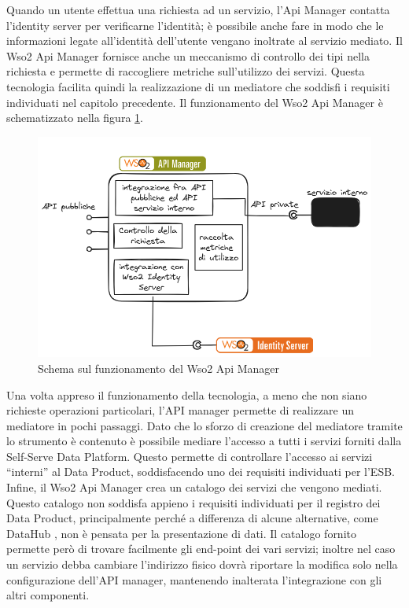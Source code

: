\documentclass[12pt]{report}
\begin{document}
Quando un utente effettua una richiesta ad un servizio, l'Api Manager contatta l'identity server per verificarne l'identità; è possibile anche fare in modo che le informazioni legate all'identità dell'utente vengano inoltrate al servizio mediato.
Il Wso2 Api Manager fornisce anche un meccanismo di controllo dei tipi nella richiesta e permette di raccogliere metriche sull'utilizzo dei servizi. 
Questa tecnologia facilita quindi la realizzazione di un mediatore che soddisfi i requisiti individuati nel capitolo precedente.
Il funzionamento del Wso2 Api Manager è schematizzato nella figura \ref{funzionamento_api_manager}.
\begin{figure}[H]
    \centering
    \includegraphics[width=\linewidth]{immagini/wso2 apim schema.png}
    \caption{Schema sul funzionamento del Wso2 Api Manager}
    \label{funzionamento_api_manager}
\end{figure}
Una volta appreso il funzionamento della tecnologia, a meno che non siano richieste operazioni particolari, l'API manager permette di realizzare un mediatore in pochi passaggi.
Dato che lo sforzo di creazione del mediatore tramite lo strumento è contenuto è possibile mediare l'accesso a tutti i servizi forniti dalla Self-Serve Data Platform.
Questo permette di controllare l'accesso ai servizi ``interni'' al Data Product, soddisfacendo uno dei requisiti individuati per l'ESB.
Infine, il Wso2 Api Manager crea un catalogo dei servizi che vengono mediati. 
Questo catalogo non soddisfa appieno i requisiti individuati per il registro dei Data Product, principalmente perché a differenza di alcune alternative, come DataHub \cite{documentazione_data_hub}, non è pensata per la presentazione di dati.
Il catalogo fornito permette però di trovare facilmente gli end-point dei vari servizi; inoltre nel caso un servizio debba cambiare l'indirizzo fisico dovrà riportare la modifica solo nella configurazione dell'API manager, mantenendo inalterata l'integrazione con gli altri componenti.
\end{document}
